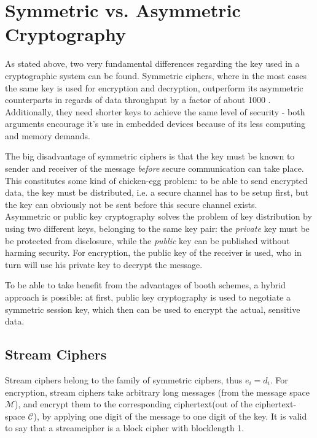 \section{Symmetric vs. Asymmetric Cryptography}

As stated above, two very fundamental differences regarding the key used in a cryptographic system can be found. Symmetric ciphers, where in the most cases
the same key is used for encryption and decryption, outperform its asymmetric counterparts in regards of data throughput by a factor of about 1000 \cite{5412055}.
Additionally, they need shorter keys to achieve the same level of security - both arguments encourage it's use in embedded devices because of its less computing
and memory demands.

The big disadvantage of symmetric ciphers is that the key must be known to sender
and receiver of the message \textit{before} secure communication can take place. This constitutes some kind of chicken-egg problem: to be able to send encrypted
data, the key must be distributed, i.e. a secure channel has to be setup first, but the key can obviously not be sent before this secure channel exists.
\\

Asymmetric or public key cryptography solves the problem of key distribution by using two different keys, belonging to the same key pair: the \textit{private}
key must be be protected from disclosure, while the \textit{public} key can be published without harming security. For encryption, the public key of the receiver
is used, who in turn will use his private key to decrypt the message. 

To be able to take benefit from the advantages of booth schemes, a hybrid approach is possible: at first, public key cryptography is used to negotiate a symmetric session
key, which then can be used to encrypt the actual, sensitive data.

\subsection{Stream Ciphers}

Stream ciphers belong to the family of symmetric ciphers, thus $e_i = d_i$.
For encryption, stream ciphers take arbitrary long messages (from the message space $\mathcal{M}$), and encrypt
them to the corresponding ciphertext(out of the ciphertext-space $\mathcal{C}$), by applying
one digit of the message to one digit of the key. It is valid to say that a streamcipher is a block cipher with blocklength 1.

